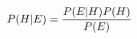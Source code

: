 \documentclass[preview]{standalone}
\begin{document}
\begin{align*}
P(H|E) = {P(E|H) P(H) \over P(E)}
\end{align*}
\end{document}
